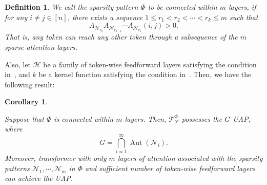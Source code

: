 \documentclass{article}
\newtheorem{corollary}{Corollary}
\newtheorem{definition}{Definition}
\newcommand{\cjp}[1]{{\footnotesize\textcolor{orange}{JC: #1}}}
\newcommand{\ql}[1]{{\footnotesize\textcolor{red}{QL: #1}}}
\begin{document}
\begin{definition}

We call the sparsity pattern $\Phi$ to be connected within $m$ layers, if for any $i\neq j\in [n]$, there exists a sequence $1\le r_1< r_2<\cdots <r_k\le m$ such that
\begin{equation}
    A_{\mathcal N_{r_k}}A_{\mathcal N_{r_{k-1}}}\cdots A_{\mathcal N_{r_1}}(i,j)>0.
\end{equation}
That is, any token can reach any other token through a subsequence of the $m$ sparse attention layers.
\end{definition}

 Also, let $\mathcal H$ be a family of token-wise feedforward layers satisfying the condition in~, and $k$ be a kernel function satisfying the condition in~.
Then, we have the following result:
\begin{corollary}
    \label{prop:sparse}

    Suppose that $\Phi$ is connected within $m$ layers.
    Then, $\mathcal T_{\mathcal F}^\Phi$ possesses the $G$-UAP, where
    \begin{equation}
        \label{eq:sparse_group}
        G=\bigcap_{i=1}^\infty \operatorname{Aut}(\mathcal N_i).
    \end{equation}
    Moreover, transformer with only $m$ layers of attention associated with the sparsity patterns $\mathcal N_1,\cdots, \mathcal N_m$ in $\Phi$ and sufficient number of token-wise feedforward layers can achieve the UAP.
\end{corollary}
\end{document}

